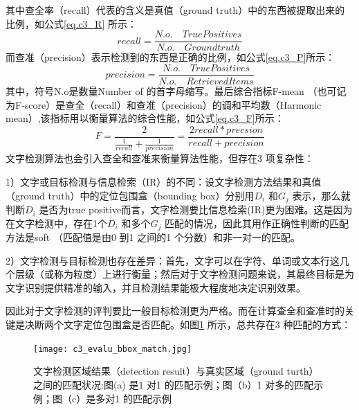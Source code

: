         其中查全率（recall）代表的含义是真值（ground truth）中的东西被提取出来的比例，如公式\ref{eq.c3_R} 所示：
        \begin{equation}
        recall=\frac{N.o. \quad True Positives}{N.o. \quad Ground truth}
        \label{eq.c3_R}
        \end{equation}
        而查准（precision）表示检测到的东西是正确的比例，如公式\ref{eq.c3_P}所示：
        \begin{equation}
        precision=\frac{N.o. \quad True Positives}{N.o. \quad Retrieved Items}
        \label{eq.c3_P}
        \end{equation}
        其中，符号N.o是数量Number of 的首字母缩写。最后综合指标F-mean （也可记为F-score）是查全（recall）和查准（precision）的调和平均数（Harmonic mean）,该指标用以衡量算法的综合性能，如公式\ref{eq.c3_F}所示：
        \begin{equation}
        F=\frac{2}{\frac{1}{recall}+\frac{1}{precision}}=\frac{2recall*precsion}{recall+precision}
        \label{eq.c3_F}
        \end{equation}
        文字检测算法也会引入查全和查准来衡量算法性能，但存在3 项复杂性：

        1）文字或目标检测与信息检索（IR）的不同：设文字检测方法结果和真值（ground truth）中的定位包围盒（bounding box）分别用$D_i$ 和$G_j$ 表示，那么就判断$D_i$ 是否为true positive而言，文字检测要比信息检索(IR)更为困难。这是因为在文字检测中，存在1个$D_i$ 和多个$G_j$ 匹配的情况，因此其用作正确性判断的匹配方法是soft （匹配值是由0 到1 之间的1 个分数）和非一对一的匹配。

        2）文字检测与目标检测也存在差异：首先，文字可以在字符、单词或文本行这几个层级（或称为粒度）上进行衡量；然后对于文字检测问题来说，其最终目标是为文字识别提供精准的输入，并且检测结果能极大程度地决定识别效果。

        因此对于文字检测的评判要比一般目标检测更为严格。而在计算查全和查准时的关键是决断两个文字定位包围盒是否匹配。如图\ref{fig.c3_evalu_bbox_match} 所示，总共存在3 种匹配的方式：

        \begin{figure}[!h]
        \centering
        \texttt{[image: c3\_evalu\_bbox\_match.jpg]} \caption{文字检测区域结果（detection result）与真实区域（ground turth）之间的匹配状况:图(a) 是1 对1 的匹配示例；图（b）1 对多的匹配示例；图（c）是多对1 的匹配示例}
        \label{fig.c3_evalu_bbox_match}
        \end{figure}

